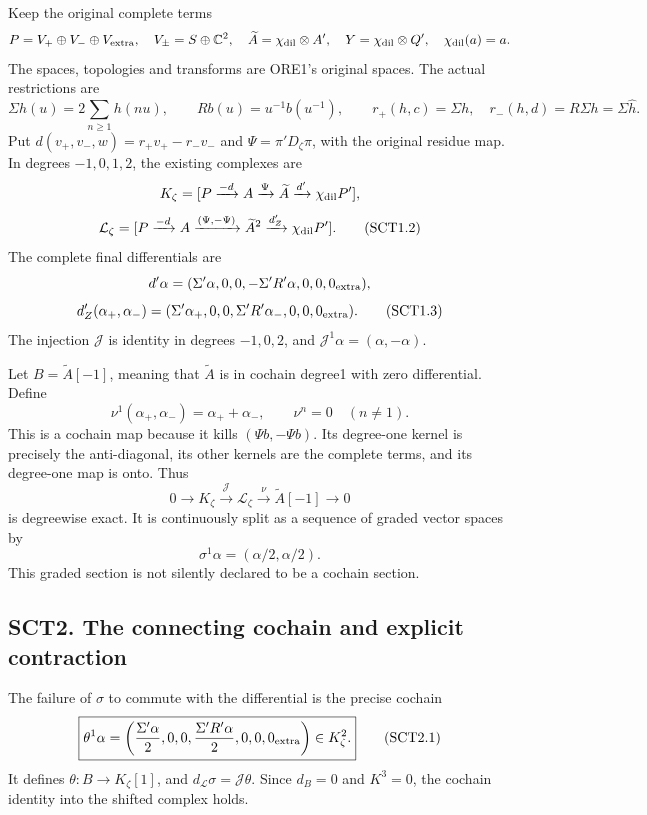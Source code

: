 Keep the original complete terms \[
P=V_+\oplus V_-\oplus V_{\rm extra},\quad
V_\pm=S\oplus\mathbb C^2,\quad
\widetilde A=\chi_{\rm dil}\otimes A',\quad
Y=\chi_{\rm dil}\otimes Q',\quad\chi_{\rm dil}(a)=a.
\] The spaces, topologies and transforms are ORE1's original spaces. The
actual restrictions are \[
\Sigma h(u)=2\sum_{n\ge1}h(nu),\qquad
Rb(u)=u^{-1}b(u^{-1}),\qquad
r_+(h,c)=\Sigma h,\quad r_-(h,d)=R\Sigma h=\Sigma\widehat h.
\tag{SCT1.1}
\] Put \(d(v_+,v_-,w)=r_+v_+-r_-v_-\) and \(\Psi=\pi'D_\zeta\pi\), with
the original residue map. In degrees \(-1,0,1,2\), the existing
complexes are \[
K_\zeta=[P\xrightarrow{-d}A\xrightarrow{\Psi}
\widetilde A\xrightarrow{d'}\chi_{\rm dil}P'],
\] \[
\mathcal L_\zeta=[P\xrightarrow{-d}A\xrightarrow{(\Psi,-\Psi)}
\widetilde A^2\xrightarrow{d_Z'}\chi_{\rm dil}P'].
\tag{SCT1.2}
\] The complete final differentials are \[
d'\alpha=(\Sigma'\alpha,0,0,-\Sigma'R'\alpha,0,0,0_{\rm extra}),
\] \[
d_Z'(\alpha_+,\alpha_-)
=(\Sigma'\alpha_+,0,0,\Sigma'R'\alpha_-,0,0,0_{\rm extra}).
\tag{SCT1.3}
\] The injection \(\mathcal J\) is identity in degrees \(-1,0,2\), and
\(\mathcal J^1\alpha=(\alpha,-\alpha)\).

Let \(B=\widetilde A[-1]\), meaning that \(\widetilde A\) is in cochain
degree1 with zero differential. Define \[
\nu^1(\alpha_+,\alpha_-)=\alpha_++\alpha_-,
\qquad \nu^n=0\quad(n\ne1).
\tag{SCT1.4}
\] This is a cochain map because it kills \((\Psi b,-\Psi b)\). Its
degree-one kernel is precisely the anti-diagonal, its other kernels are
the complete terms, and its degree-one map is onto. Thus \[
\boxed{0\to K_\zeta\xrightarrow{\mathcal J}\mathcal L_\zeta
\xrightarrow{\nu}\widetilde A[-1]\to0}
\tag{SCT1.5}
\] is degreewise exact. It is continuously split as a sequence of graded
vector spaces by \[
\sigma^1\alpha=(\alpha/2,\alpha/2).
\tag{SCT1.6}
\] This graded section is not silently declared to be a cochain section.

\subsection{SCT2. The connecting cochain and explicit
contraction}\label{sct2.-the-connecting-cochain-and-explicit-contraction}

The failure of \(\sigma\) to commute with the differential is the
precise cochain \[
\boxed{\theta^1\alpha
=\left(\frac{\Sigma'\alpha}{2},0,0,
\frac{\Sigma'R'\alpha}{2},0,0,0_{\rm extra}\right)
\in K_\zeta^2.}
\tag{SCT2.1}
\] It defines \(\theta:B\to K_\zeta[1]\), and
\(d_{\mathcal L}\sigma=\mathcal J\theta\). Since \(d_B=0\) and
\(K^3=0\), the cochain identity into the shifted complex holds.

